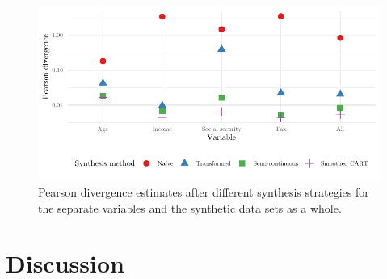 \documentclass[
]{template/style/uneceart}
\begin{document}
\begin{figure}[t]

{\centering \includegraphics[width=1\textwidth,height=\textheight]{dr-utility-volker-kesteren_files/figure-pdf/fig-PE-div-1.pdf}

}

\caption{\label{fig-PE-div}Pearson divergence estimates after different
synthesis strategies for the separate variables and the synthetic data
sets as a whole.}

\end{figure}

\hypertarget{discussion}{%
\section{Discussion}\label{discussion}}
\end{document}
